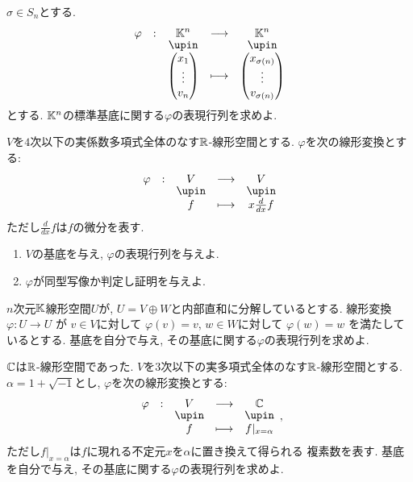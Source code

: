 \begin{quiz}
  $\sigma\in S_n$とする.
  \begin{align*}
    \shazo{\varphi}{\KK^n}{\KK^n}
    {\begin{pmatrix}x_1\\\vdots\\v_n\end{pmatrix}}{\begin{pmatrix}x_{\sigma(n)}\\\vdots\\v_{\sigma(n)}\end{pmatrix}}
  \end{align*}
  とする.
  $\mathbb{K}^n$の標準基底に関する$\varphi$の表現行列を求めよ.
\end{quiz}

\begin{quiz}
  $V$を$4$次以下の実係数多項式全体のなす$\mathbb{R}$-線形空間とする.
  $\varphi$を次の線形変換とする:
  \begin{align*}
    \shazo{\varphi}{V}{V}
    {f}{x\frac{d}{dx}f}
  \end{align*}
  ただし$\frac{d}{dx}f$は$f$の微分を表す.
  \begin{enumerate}
  \item $V$の基底を与え, $\varphi$の表現行列を与えよ.
  \item $\varphi$が同型写像か判定し証明を与えよ.
  \end{enumerate}
\end{quiz}

\begin{quiz}
  $n$次元$\mathbb{K}$線形空間$U$が,
  $U=V\oplus W$と内部直和に分解しているとする.
  線形変換
  $\varphi\colon U\to U$
  が
  $v\in V$に対して
  $\varphi(v)=v$,
  $w\in W$に対して
  $\varphi(w)=w$
  を満たしているとする.
  基底を自分で与え,
  その基底に関する$\varphi$の表現行列を求めよ. 
\end{quiz}


\begin{quiz}
  $\mathbb{C}$は$\mathbb{R}$-線形空間であった.
  $V$を$3$次以下の実多項式全体のなす$\mathbb{R}$-線形空間とする.
  $\alpha=1+\sqrt{-1}$とし,
  $\varphi$を次の線形変換とする:
  \begin{align*}
    \shazo{\varphi}{V}{\CC}
          {f}{f|_{x=\alpha}},
  \end{align*}
  ただし$f|_{x=\alpha}$は$f$に現れる不定元$x$を$\alpha$に置き換えて得られる
  複素数を表す.
  基底を自分で与え,
  その基底に関する$\varphi$の表現行列を求めよ. 
\end{quiz}

